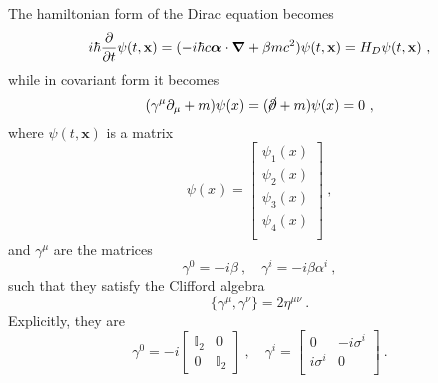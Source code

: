     The hamiltonian form of the Dirac equation becomes 
    \begin{equation}\label{hamdirac}
        i \hbar \frac{\partial}{\partial t} \psi (t, \mathbf x) = (- i \hbar c \boldsymbol \alpha \cdot \boldsymbol \nabla + \beta m c^2) \psi (t, \mathbf x)  = H_D \psi (t, \mathbf x) ~,
    \end{equation}
    while in covariant form it becomes 
    \begin{equation}\label{covdirac}
        (\gamma^\mu \partial_\mu + m) \psi(x) = (\cancel \partial + m ) \psi(x) = 0 ~,
    \end{equation}
    where $\psi(t, \mathbf x)$ is a matrix 
    \begin{equation*}
        \psi(x) = \begin{bmatrix} \psi_1(x) \\ \psi_2(x) \\ \psi_3(x) \\ \psi_4(x) \\ \end{bmatrix} ~,
    \end{equation*}
    and $\gamma^\mu$ are the matrices 
    \begin{equation*}
        \gamma^0 = - i \beta ~, \quad \gamma^i = - i \beta \alpha^i ~,
    \end{equation*}
    such that they satisfy the Clifford algebra
    \begin{equation}\label{cliffordrel}
        \{\gamma^\mu, \gamma^\nu\} = 2 \eta^{\mu\nu} ~.
    \end{equation}
    Explicitly, they are 
    \begin{equation*}
        \gamma^0 = - i \begin{bmatrix} \mathbb I_2 & 0 \\ 0 & \mathbb I_2 \end{bmatrix} ~, \quad \gamma^i = \begin{bmatrix} 0 & - i \sigma^i \\ i \sigma^i & 0 \\ \end{bmatrix} ~.
    \end{equation*}
